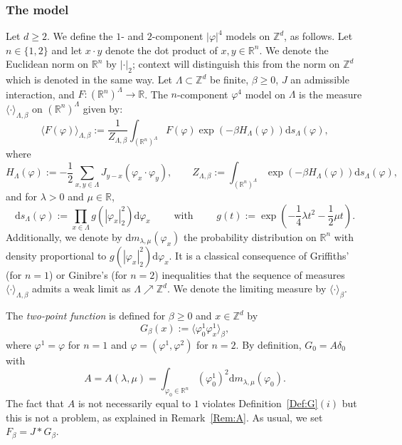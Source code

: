 \documentclass[11pt,a4paper]{article}
\numberwithin{equation}{section}
\theoremstyle{plain}
\theoremstyle{definition}
\newcommand\1{\mathds{1}}
\begin{document}
\subsubsection{The model}

Let $d\geq 2$. We define the $1$- and $2$-component $|\varphi|^4$ models on $\mathbb Z^d$,
as follows. Let $n\in \{1,2\}$ and let $x\cdot y$ denote the dot product of $x,y\in\mathbb R^n$. We
denote the Euclidean norm on $\mathbb R^n$ by $|\cdot|_2$; context will distinguish this from the norm on $\mathbb Z^d$ which is denoted in the same way. Let $\Lambda\subset \mathbb Z^d$ be finite, $\beta\geq 0$, $J$ an admissible interaction, and $F:(\mathbb R^n)^\Lambda\rightarrow \mathbb R$. The $n$-component $\varphi^4$ model on $\Lambda$ is the measure $\langle \cdot\rangle_{\Lambda,\beta}$ on $(\mathbb R^n)^\Lambda$ given by:
\begin{equation}\label{eq:def phi4}
	\langle F(\varphi)\rangle_{\Lambda,\beta}:=\frac{1}{Z_{\Lambda,\beta}}\int_{(\mathbb R^n)^\Lambda}F(\varphi)\exp(-\beta H_{\Lambda}(\varphi))\mathrm{d}s_{\Lambda}(\varphi),
\end{equation}
where
\begin{equation}
	H_{\Lambda}(\varphi):= - \frac 12 \sum_{x,y\in \Lambda}
J_{y-x}(\varphi_x\cdot \varphi_y), \qquad Z_{\Lambda,\beta}:=\int_{(\mathbb R^n)^\Lambda}\exp(-\beta H_{\Lambda}(\varphi))\mathrm{d}s_{\Lambda}(\varphi),
\end{equation}
and for $\lambda>0$ and $\mu\in \mathbb R$,
\begin{equation}
	\mathrm{d}s_{\Lambda}(\varphi):=
    \prod_{x\in \Lambda}g(|\varphi_x|^2_2)\mathrm{d}\varphi_x
    \qquad\text{ with }
    \qquad g(t):=\exp\left(-  \frac 14   \lambda t^2-  \frac 12  \mu t\right).
\end{equation}
Additionally, we denote by $\mathrm{d}m_{\lambda,\mu}(\varphi_x)$ the probability distribution on $\mathbb R^n$ with density proportional to $g(|\varphi_x|_2^2)\mathrm{d}\varphi_x$.
It is a classical consequence of Griffiths' \cite{Grif67} (for $n=1$) or Ginibre's \cite{Gini70} (for $n=2$) inequalities that the sequence of measures $\langle \cdot\rangle_{\Lambda,\beta}$ admits a weak limit as $\Lambda\nearrow \mathbb Z^d$. We denote the limiting measure by $\langle \cdot\rangle_{\beta}$.

The \emph{two-point function} is defined for $\beta\geq 0$ and $x\in \mathbb Z^d$ by
\begin{equation}
	G_\beta(x):=\langle \varphi_0^1\varphi_x^1\rangle_{\beta},
\end{equation}
where $\varphi^1=\varphi$ for $n=1$ and $\varphi=(\varphi^1,\varphi^2)$ for $n=2$.
By definition, $G_0=A\delta_0$ with
\begin{equation}
\label{eq:Aphi4}
	A=A(\lambda,\mu)=\int_{\varphi_0\in \mathbb R^n}(\varphi_0^1)^2\mathrm{d}m_{\lambda,\mu}(\varphi_0). \end{equation}
The fact that $A$ is not necessarily equal to $1$ violates Definition~\ref{Def:G}$(i)$ but this is not a problem, as explained in
Remark~\ref{Rem:A}.
As usual, we set $F_\beta=J*G_\beta$.
\end{document}
